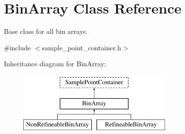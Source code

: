 \hypertarget{classBinArray}{}\section{Bin\+Array Class Reference}
\label{classBinArray}


Base class for all bin arrays.  




{\ttfamily \#include $<$sample\+\_\+point\+\_\+container.\+h$>$}

Inheritance diagram for Bin\+Array\+:\begin{figure}[H]
\begin{center}
\leavevmode
\includegraphics[height=3.000000cm]{classBinArray}
\end{center}
\end{figure}
